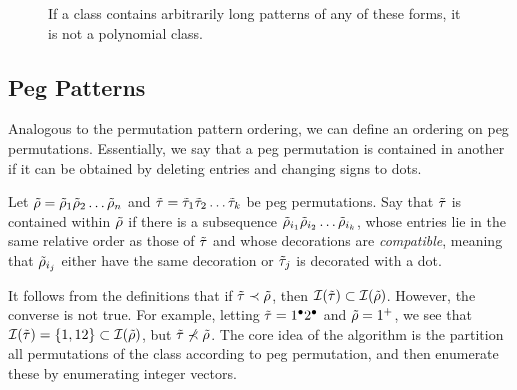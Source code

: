\begin{figure}[t]

    \caption{If a class contains arbitrarily long patterns of any of these forms,
    it is not a polynomial class.}
    \label{polyclass:fig:alternations}
    \end{figure}


  \subsection{Peg Patterns}

    Analogous to the permutation pattern ordering, we can define an ordering on
    peg permutations. Essentially, we say that a peg permutation is contained in
    another if it can be obtained by deleting entries and changing signs to dots. 


    \begin{definition} \label{polyclass:def:pegpattern}
      Let $\tilde{\rho} = \tilde{\rho}_1 \tilde{\rho}_2 \dots \tilde{\rho}_n$ and $\tilde{\tau} = \tilde{\tau}_1 \tilde{\tau}_2 \dots
      \tilde{\tau}_k$ be peg permutations. Say that $\tilde{\tau}$ is contained within $\tilde{\rho}$ if
      there is a subsequence $\tilde{\rho}_{i_1} \tilde{\rho}_{i_2} \dots \tilde{\rho}_{i_k}$, whose
      entries lie in the same relative order as those of $\tilde{\tau}$ and whose
      decorations are \emph{compatible}, meaning that $\tilde{\rho}_{i_j}$ either have
      the same decoration or $\tilde{\tau}_j$ is decorated with a dot. 
    \end{definition}

    It follows from the definitions that if $\tilde{\tau} \prec \tilde{\rho}$, then $\mathcal{I}(\tilde{\tau})
    \subset \mathcal{I}(\tilde{\rho})$. However, the converse is not true. For example, letting
    $\tilde{\tau} = 1^\bullet 2^\bullet$ and $\tilde{\rho} = 1^+$, we see that $\mathcal{I}(\tilde{\tau}) = \{1, 12\}
    \subset \mathcal{I}(\tilde{\rho})$, but $\tilde{\tau} \not \prec \tilde{\rho}$. The core idea of the algorithm
    is the partition all permutations of the class according to peg permutation,
    and then enumerate these by enumerating integer vectors. 

